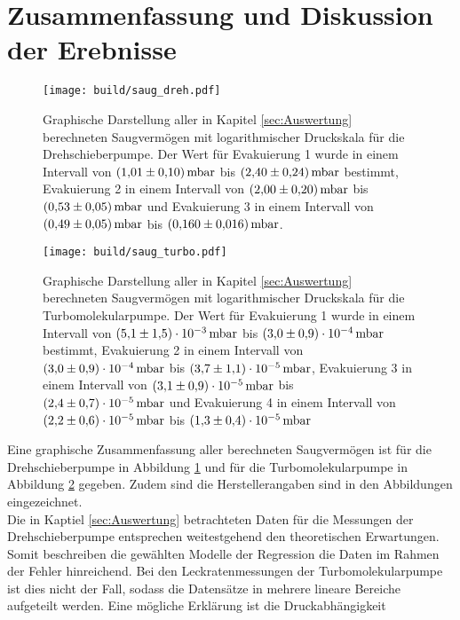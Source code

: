 \section{Zusammenfassung und Diskussion der Erebnisse}
\label{sec:Diskussion}
\begin{figure}[ht]
        \centering
        \texttt{[image: build/saug\_dreh.pdf]}
        \caption{Graphische Darstellung aller in Kapitel \ref{sec:Auswertung} berechneten Saugvermögen mit logarithmischer Druckskala für die Drehschieberpumpe. Der Wert für Evakuierung 1 wurde in einem Intervall von ${\SI{1.01 \pm 0.10}{\milli\bar}}$ bis ${\SI{2.40\pm 0.24}{\milli\bar}}$ bestimmt, Evakuierung 2 in einem Intervall von ${\SI{2.00 \pm 0.20}{\milli\bar}}$ bis ${\SI{0.53\pm 0.05}{\milli\bar}}$ und Evakuierung 3 in einem Intervall von ${\SI{0.49 \pm 0.05}{\milli\bar}}$ bis ${\SI{0.160 \pm 0.016}{\milli\bar}}$.}
        \label{fig:saug_dreh}
\end{figure}
\begin{figure}
        \centering
        \texttt{[image: build/saug\_turbo.pdf]}
        \caption{Graphische Darstellung aller in Kapitel \ref{sec:Auswertung} berechneten Saugvermögen mit logarithmischer Druckskala für die Turbomolekularpumpe. Der Wert für Evakuierung 1 wurde in einem Intervall von ${\SI{5.1 \pm 1.5 e-3}{\milli\bar}}$ bis ${\SI{3.0 \pm 0.9 e-4}{\milli\bar}}$ bestimmt, Evakuierung 2 in einem Intervall von ${\SI{3.0 \pm 0.9 e-4}{\milli\bar}}$ bis ${\SI{3.7 \pm 1.1 e-5}{\milli\bar}}$, Evakuierung 3 in einem Intervall von ${\SI{3.1 \pm 0.9 e-5}{\milli\bar}}$ bis ${\SI{2.4 \pm 0.7 e-5}{\milli\bar}}$ und Evakuierung 4 in einem Intervall von ${\SI{2.2 \pm 0.6 e-5}{\milli\bar}}$ bis ${\SI{1.3 \pm 0.4 e-5}{\milli\bar}}$}
        \label{fig:saug_turbo}
\end{figure}
\noindent
Eine graphische Zusammenfassung aller berechneten Saugvermögen ist für die Drehschieberpumpe in 
Abbildung \ref{fig:saug_dreh} und für die Turbomolekularpumpe in Abbildung \ref{fig:saug_turbo} 
gegeben. Zudem sind die Herstellerangaben sind in den Abbildungen eingezeichnet.
\\
Die in Kaptiel \ref{sec:Auswertung} betrachteten Daten für die Messungen der Drehschieberpumpe 
entsprechen weitestgehend den theoretischen Erwartungen. Somit beschreiben die gewählten 
Modelle der Regression die Daten im Rahmen der Fehler hinreichend. Bei den Leckratenmessungen
der Turbomolekularpumpe ist dies nicht der Fall, sodass die Datensätze in mehrere lineare
Bereiche aufgeteilt werden. Eine mögliche Erklärung ist die Druckabhängigkeit 
